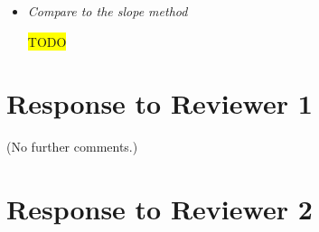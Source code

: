 \documentclass[11pt]{article}
\newcommand{\hilight}[1]{\colorbox{yellow}{#1}}
\newcommand{\todo}{\hilight{TODO}}
\begin{document}
\begin{itemize}

\item \textit{Compare to the slope method}

\todo

\end{itemize}


\section*{Response to Reviewer 1}

(No further comments.)


\section*{Response to Reviewer 2}
\end{document}
